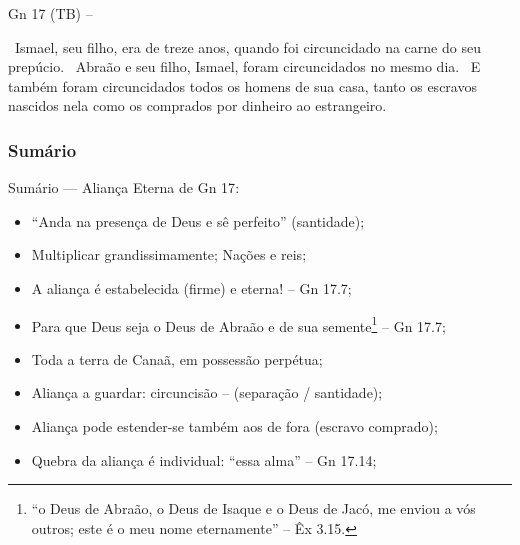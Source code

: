 \documentclass[12pt,aspectratio=169]{beamer}
\newcommand{\ver}[1]{%
    \raisebox{0.50ex}{%
        \scalebox{1.1}{%
            \pmb{\textbf{\textcolor{BSpbg}{#1}}}%
        }%
    }%
}
\newcommand{\QUOTE}[1]{%
    \par\noindent\hspace*{0.05\linewidth}%
    \begin{minipage}{0.9\linewidth}%
        \linespread{1.35}\large{#1}%
    \end{minipage}%
}
\newcommand{\RED}[1]{{\textcolor{TXred}{#1}}}
\newcommand{\ORA}[1]{{\textcolor{TXred!50!TXyel}{#1}}}
\newcommand{\YEL}[1]{{\textcolor{TXyel}{#1}}}
\newcommand{\GRE}[1]{{\textcolor{TXgre}{#1}}}
\newcommand{\CYA}[1]{{\textcolor{TXcya}{#1}}}
\newcommand{\BLU}[1]{{\textcolor{TXblu}{#1}}}
\newcommand{\MAG}[1]{{\textcolor{TXmag}{#1}}}
\newcommand{\BRI}[1]{{\textcolor{BSpbg}{#1}}}   %
\begin{document}
\begin{frame}[allowframebreaks]{\BRI{Gn 17} (TB) --}
        \pagebreak

        \QUOTE{%
            \ver{25}~Ismael, seu filho, era de treze anos, quando foi circuncidado na carne do
            seu prepúcio.
            \ver{26}~Abraão e seu filho, Ismael, foram circuncidados no mesmo dia.
            \ver{27}~E também foram circuncidados todos os homens de sua casa, tanto os escravos
            nascidos nela como os comprados por dinheiro ao estrangeiro.
        }

    \end{frame}

    \subsubsection{Sumário}

    \begin{frame}
        \par\noindent\hspace*{0.05\linewidth}%
        \begin{minipage}{0.9\linewidth}%
            \large%
            \begin{alertblock}{Sumário --- \YEL{Aliança Eterna} de \BRI{Gn 17}:}
                \normalsize
                \begin{itemize}
					\item<1-> ``\MAG{Anda na presença} de Deus e \MAG{sê perfeito}'' (santidade);
					\item<1-> Multiplicar \YEL{grandissimamente}; Nações e \GRE{reis};
					\item<1-> A aliança é \YEL{estabelecida} (firme) e \CYA{eterna!} -- Gn 17.7;
                    \item<1-> Para que \BLU{Deus seja o Deus de Abraão e de sua
                        semente}\footnote{``o \BLU{Deus de Abraão}, o \BLU{Deus de Isaque} e o
                        \BLU{Deus de Jacó}, me enviou a vós outros; \MAG{este é o meu nome
                        eternamente}'' -- \BRI{Êx 3.15}.} -- Gn 17.7;
					\item<1-> Toda a \YEL{terra} de Canaã, em \GRE{possessão} \YEL{perpétua};
					\item<1-> Aliança a guardar: \MAG{circuncisão} -- (separação / santidade);
					\item<1-> Aliança pode estender-se também \ORA{aos de fora} (escravo comprado);
					\item<1-> \RED{Quebra} da aliança é \YEL{individual}: ``\YEL{essa alma}'' -- Gn
						17.14;
                \end{itemize}
            \end{alertblock}
        \end{minipage}%
    \end{frame}
\end{document}
